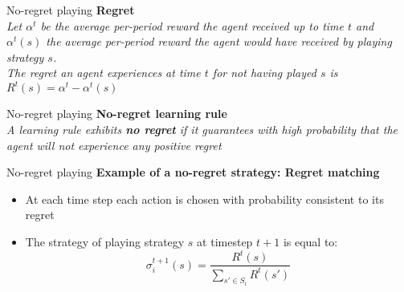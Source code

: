 


\begin{frame}{No-regret playing}
    \textbf{Regret}\\
    \textit{Let $\alpha^t$ be the average per-period reward the agent received up to time $t$ and $\alpha^t(s)$ the average per-period reward the agent would have received by playing strategy $s$.}\\
    \textit{The regret an agent experiences at time $t$ for not having played $s$ is $R^t(s)=\alpha^t-\alpha^t(s)$}
\end{frame}

\begin{frame}{No-regret playing}
    \textbf{No-regret learning rule}\\
    \textit{A learning rule exhibits \textbf{no regret} if it guarantees with high probability that the agent will not experience any positive regret}
\end{frame}

\begin{frame}{No-regret playing}
    \textbf{Example of a no-regret strategy: Regret matching}\\
    \begin{itemize}
        \item At each time step each action is chosen with probability consistent to its regret
        \item The strategy of playing strategy $s$ at timestep $t+1$ is equal to:
        \[
            \sigma_i^{t+1}(s)= \frac{R^t(s)}{\sum_{s'\in S_i} R^t(s')}
        \]
    \end{itemize}
\end{frame}



